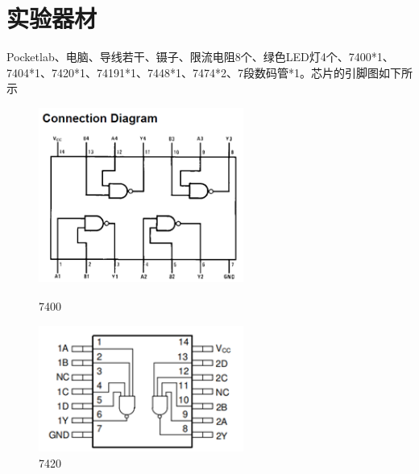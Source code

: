 \documentclass{ctexart}
\begin{document}
\section{实验器材}
Pocketlab、电脑、导线若干、镊子、限流电阻8个、绿色LED灯4个、7400*1、7404*1、7420*1、74191*1、7448*1、7474*2、7段数码管*1。芯片的引脚图如下所示
\begin{figure}[H]
    \centering
    \begin{minipage}{0.45\textwidth}
    \centering
           \includegraphics[width=0.6\textwidth]{7400.png}
           \caption{7400}
    \label{}
    \end{minipage}
    \hspace{0.05\textwidth}
    \begin{minipage}{0.45\textwidth}
    \centering
           \includegraphics[width=0.6\textwidth]{7420.png}
           \caption{7420}
    \label{7474}
    \end{minipage}
\end{figure}
\end{document}
